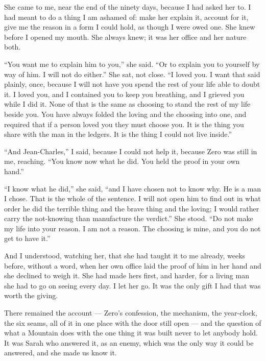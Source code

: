 \ornament

She came to me, near the end of the ninety days, because I had asked her to. I had meant to do a thing I am ashamed of: make her explain it, account for it, give me the reason in a form I could hold, as though I were owed one. She knew before I opened my mouth. She always knew; it was her office and her nature both.\par

``You want me to explain him to you,'' she said. ``Or to explain you to yourself by way of him. I will not do either.'' She sat, not close. ``I loved you. I want that said plainly, once, because I will not have you spend the rest of your life able to doubt it. I loved you, and I contained you to keep you breathing, and I grieved you while I did it. None of that is the same as choosing to stand the rest of my life beside you. You have always folded the loving and the choosing into one, and required that if a person loved you they must choose you. It is the thing you share with the man in the ledgers. It is the thing I could not live inside.''\par

``And Jean-Charles,'' I said, because I could not help it, because Zero was still in me, reaching. ``You know now what he did. You held the proof in your own hand.''\par

``I know what he did,'' she said, ``and I have chosen not to know why. He is a man I chose. That is the whole of the sentence. I will not open him to find out in what order he did the terrible thing and the brave thing and the loving; I would rather carry the not-knowing than manufacture the verdict.'' She stood. ``Do not make my life into your reason. I am not a reason. The choosing is mine, and you do not get to have it.''\par

And I understood, watching her, that she had taught it to me already, weeks before, without a word, when her own office laid the proof of him in her hand and she declined to weigh it. She had made hers first, and harder, for a living man she had to go on seeing every day. I let her go. It was the only gift I had that was worth the giving.\par

\ornament

There remained the account --- Zero's confession, the mechanism, the year-clock, the six seams, all of it in one place with the door still open --- and the question of what a Mountain does with the one thing it was built never to let anybody hold. It was Sarah who answered it, as an enemy, which was the only way it could be answered, and she made us know it.\par

